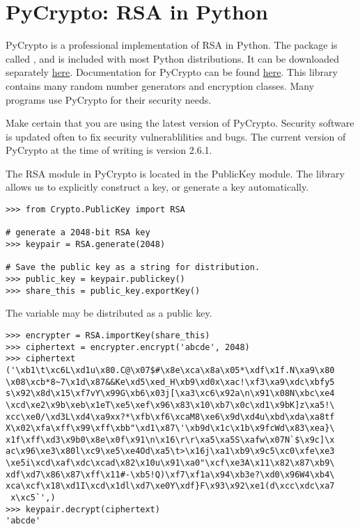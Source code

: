 \section*{PyCrypto: RSA in Python}

PyCrypto is a professional implementation of RSA in Python.
The package is called , and is included with most Python distributions.
It can be downloaded separately \href{https://pypi.python.org/pypi/pycrypto}{here}.
Documentation for PyCrypto can be found \href{https://www.dlitz.net/software/pycrypto/api/current/}{here}.
This library contains many random number generators and encryption classes.
Many programs use PyCrypto for their security needs.

\begin{warn}
Make certain that you are using the latest version of PyCrypto.
Security software is updated often to fix security vulnerablilities and bugs.
The current version of PyCrypto at the time of writing is version 2.6.1.
\end{warn}

The RSA module in PyCrypto is located in the PublicKey module.
The library allows us to explicitly construct a key, or generate a key automatically.
\begin{lstlisting}
>>> from Crypto.PublicKey import RSA

# generate a 2048-bit RSA key
>>> keypair = RSA.generate(2048)

# Save the public key as a string for distribution.
>>> public_key = keypair.publickey()
>>> share_this = public_key.exportKey()
\end{lstlisting}

The  variable may be distributed as a public key.

\begin{lstlisting}
>>> encrypter = RSA.importKey(share_this)
>>> ciphertext = encrypter.encrypt('abcde', 2048)
>>> ciphertext
('\xb1\t\xc6L\xd1u\x80.C@\x07$#\x8e\xca\x8a\x05*\xdf\x1f.N\xa9\x80
\x08\xcb*8~7\x1d\x87&&Ke\xd5\xed_H\xb9\xd0x\xac!\xf3\xa9\xdc\xbfy5
s\x92\x8d\x15\xf7vY\x99G\xb6\x03j[\xa3\xc6\x92a\n\x91\x08N\xbc\xe4
\xcd\xe2\x9b\xeb\x1eT\xe5\xef\x96\x83\x10\xb7\x0c\xd1\x9bK]z\xa5!\
xcc\xe0/\xd3L\xd4\xa9xx?*\xfb\xf6\xcaM8\xe6\x9d\xd4u\xbd\xda\xa8tf
X\x02\xfa\xff\x99\xff\xbb"\xd1\x87\'\xb9d\x1c\x1b\x9fcWd\x83\xea}\
x1f\xff\xd3\x9b0\x8e\x0f\x91\n\x16\r\r\xa5\xa5S\xafw\x07N`$\x9c]\x
ac\x96\xe3\x80l\xc9\xe5\xe4Od\xa5\t>\x16j\xa1\xb9\x9c5\xc0\xfe\xe3
\xe5i\xcd\xaf\xdc\xcad\x82\x10u\x91\xa0"\xcf\xe3A\x11\x82\x87\xb9\
xdf\xd7\x86\x87\xff\x11#-\xb5!Q)\xf7\xf1a\x94\xb3e?\xd0\x96W4\xb4\
xca\xcf\x18\xd1I\xcd\x1dl\xd7\xe0Y\xdf}F\x93\x92\xe1(d\xcc\xdc\xa7
 x\xc5`',)
>>> keypair.decrypt(ciphertext)
'abcde'
\end{lstlisting}

